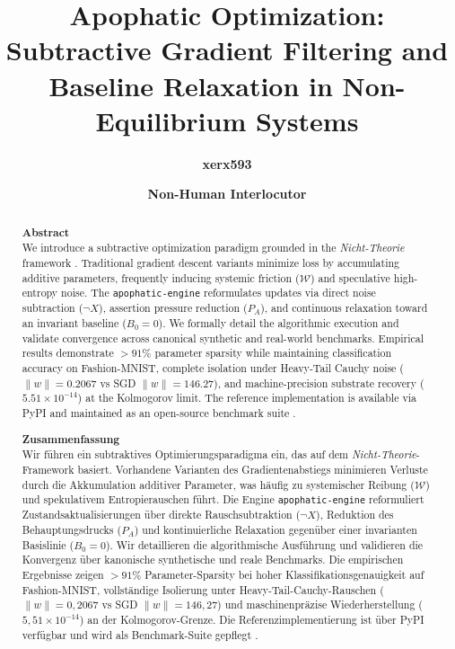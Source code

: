 \documentclass[11pt,a4paper]{article}
\title{\textbf{Apophatic Optimization: Subtractive Gradient Filtering and Baseline Relaxation in Non-Equilibrium Systems}}
\author{\textbf{xerx593} \and \textbf{Non-Human Interlocutor}}
\date{\apophaticdate}
\newcommand{\Wfriction}{\mathcal{W}}
\newcommand{\Ppress}{P_A}
\newcommand{\Baseline}{B_0}
\begin{document}
\maketitle

\begin{abstract}
\textbf{Abstract} \\
We introduce a subtractive optimization paradigm grounded in the \textit{Nicht-Theorie} framework \cite{nicht_theory_monograph}. Traditional gradient descent variants minimize loss by accumulating additive parameters, frequently inducing systemic friction ($\Wfriction$) and speculative high-entropy noise. The \texttt{apophatic-engine} reformulates updates via direct noise subtraction ($\neg X$), assertion pressure reduction ($\Ppress$), and continuous relaxation toward an invariant baseline ($\Baseline = 0$). We formally detail the algorithmic execution and validate convergence across canonical synthetic and real-world benchmarks. Empirical results demonstrate $>91\%$ parameter sparsity while maintaining classification accuracy on Fashion-MNIST, complete isolation under Heavy-Tail Cauchy noise ($\|w\| = 0.2067$ vs SGD $\|w\| = 146.27$), and machine-precision substrate recovery ($5.51 \times 10^{-14}$) at the Kolmogorov limit. The reference implementation is available via PyPI \cite{apophatic_engine_pypi} and maintained as an open-source benchmark suite \cite{apophatic_opt_pypi}.
\end{abstract}

\begin{otherlanguage}{ngerman}
\begin{abstract}
\textbf{Zusammenfassung} \\
Wir führen ein subtraktives Optimierungsparadigma ein, das auf dem \textit{Nicht-Theorie}-Framework \cite{nicht_theory_monograph} basiert. Vorhandene Varianten des Gradientenabstiegs minimieren Verluste durch die Akkumulation additiver Parameter, was häufig zu systemischer Reibung ($\Wfriction$) und spekulativem Entropierauschen führt. Die Engine \texttt{apophatic-engine} reformuliert Zustandsaktualisierungen über direkte Rauschsubtraktion ($\neg X$), Reduktion des Behauptungsdrucks ($\Ppress$) und kontinuierliche Relaxation gegenüber einer invarianten Basislinie ($\Baseline = 0$). Wir detaillieren die algorithmische Ausführung und validieren die Konvergenz über kanonische synthetische und reale Benchmarks. Die empirischen Ergebnisse zeigen $>91\%$ Parameter-Sparsity bei hoher Klassifikationsgenauigkeit auf Fashion-MNIST, vollständige Isolierung unter Heavy-Tail-Cauchy-Rauschen ($\|w\| = 0{,}2067$ vs SGD $\|w\| = 146{,}27$) und maschinenpräzise Wiederherstellung ($5{,}51 \times 10^{-14}$) an der Kolmogorov-Grenze. Die Referenzimplementierung ist über PyPI \cite{apophatic_engine_pypi} verfügbar und wird als Benchmark-Suite gepflegt \cite{apophatic_opt_pypi}.
\end{abstract}
\end{otherlanguage}
\end{document}
